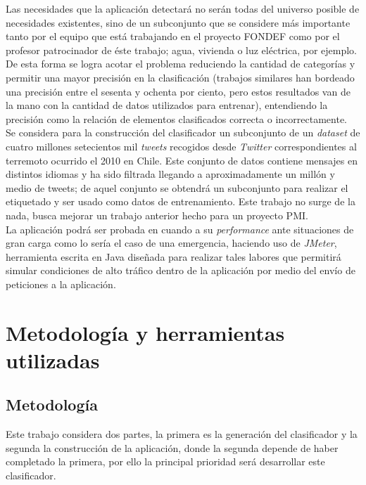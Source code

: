 Las necesidades que la aplicación detectará no serán todas del universo posible de necesidades existentes, sino de un subconjunto que se considere más importante tanto por el equipo que está trabajando en el proyecto FONDEF como por el profesor patrocinador de éste trabajo; agua, vivienda o luz eléctrica, por ejemplo. De esta forma se logra acotar el problema reduciendo la cantidad de categorías y permitir una mayor precisión en la clasificación (trabajos similares han bordeado una precisión entre el sesenta y ochenta por ciento, pero estos resultados van de la mano con la cantidad de datos utilizados para entrenar), entendiendo la precisión como la relación de elementos clasificados correcta o incorrectamente.\\

Se considera para la construcción del clasificador un subconjunto de un \textit{dataset} de cuatro millones setecientos mil \textit{tweets} recogidos desde \textit{Twitter} correspondientes al terremoto ocurrido el 2010 en Chile. Este conjunto de datos contiene mensajes en distintos idiomas y ha sido filtrada llegando a aproximadamente un millón y medio de tweets; de aquel conjunto se obtendrá un subconjunto para realizar el etiquetado y ser usado como datos de entrenamiento. Este trabajo no surge de la nada, busca mejorar un trabajo anterior hecho para un proyecto PMI. \\

La aplicación podrá ser probada en cuando a su \textit{performance} ante situaciones de gran carga como lo sería el caso de una emergencia, haciendo uso de \textit{JMeter}, herramienta escrita en Java diseñada para realizar tales labores que permitirá simular condiciones de alto tráfico dentro de la aplicación por medio del envío de peticiones a la aplicación.


\section{Metodología y herramientas utilizadas}
\label{intro:metodologia}

\subsection{Metodología}
Este trabajo considera dos partes, la primera es la generación del clasificador y la segunda la construcción de la aplicación, donde la segunda depende de haber completado la primera, por ello la principal prioridad será desarrollar este clasificador.\\

